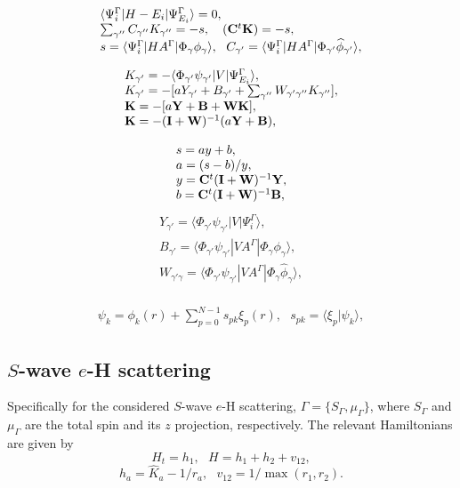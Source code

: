 \documentclass[aip
, pra
, showpacs
, aps
, twocolumn
, groupedaddress
, floatfix
]{revtex4}
\newcommand{\beq}{\begin{equation}}
\newcommand{\eeq}{\end{equation}}
\newcommand{\barr}{\begin{array}}
\newcommand{\earr}{\end{array}}
\begin{document}
\beq \barr{l}
\langle\Psi_i^\Gamma|H-E_i|\Psi_{E_i}^{\Gamma}\rangle=0,\\
\sum_{\gamma''}  C_{\gamma''} K_{\gamma''}  = -s
, \ \ \ ({\bf C}^t {\bf K}) = -s,\\
s = \langle \Psi_i^\Gamma |HA^{\Gamma} |\Phi_{\gamma} \phi_{\gamma} \rangle,\ \
C_{\gamma'} =  \langle \Psi_i^\Gamma |HA^{\Gamma} |\Phi_{\gamma'} \widehat{\phi}_{\gamma'} \rangle,
\earr \label{Psi_} \eeq

\beq \barr{l}
K_{\gamma'} = - \langle \Phi_{\gamma'}  \psi_{\gamma'}
| V | \Psi_{E_i}^{ \Gamma} \rangle,\\
K_{\gamma'} =   - [a Y_{\gamma'}   + B_{\gamma'}
+ \sum_{\gamma''}  W_{\gamma' \gamma''} K_{\gamma''}],\\
{\bf K} =   -[a {\bf Y} + {\bf B} + {\bf W K}],\\
{\bf K}  = -({\bf I}+{\bf W})^{-1}   (a {\bf Y}    + {\bf B}),
\earr \eeq

\beq \barr{l}
s = a y  + b,   \\
a = (s - b) / y,\\
y = {\bf C}^t ({\bf I}+{\bf W})^{-1}  {\bf Y}, \\
b = {\bf C}^t ({\bf I}+{\bf W})^{-1}  {\bf B},
\earr \eeq
\beq \barr{l}
Y_{\gamma'} = \langle \Phi_{\gamma'}  \psi_{\gamma'} |V |\Psi_i^{\Gamma} \rangle,\\
B_{\gamma'} = \langle \Phi_{\gamma'}  \psi_{\gamma'} |V A^{\Gamma} |\Phi_{\gamma} \phi_{\gamma} \rangle,\\
W_{\gamma' \gamma} = \langle \Phi_{\gamma'}  \psi_{\gamma'} |V A^{\Gamma} |\Phi_{\gamma} \widehat{\phi}_{\gamma} \rangle,\\
\earr \label{Psi_} \eeq

\beq \barr{l}
\psi_k = \phi_k(r) +  \sum_{p=0}^{N-1} s_{pk} \xi_p(r), \ \ \ s_{pk} = \langle \xi_p | \psi_k \rangle,
\earr \label{Psi_} \eeq


\subsection{$S$-wave $e$-H scattering}

Specifically for the considered $S$-wave $e$-H scattering,
$\Gamma=\{S_\Gamma,\mu_\Gamma\}$, where $S_\Gamma$ and $\mu_\Gamma$ are the total spin and its $z$ projection, respectively.
The relevant Hamiltonians are given by
\beq
H_t = h_1, \ \ \ H = h_1 + h_2 + v_{12},
\label{H_t} \eeq
\beq
h_a = \hat{K}_a  - 1/r_a,\ \ \ v_{12} = 1/\max{(r_{1}, r_{2})}.
\label{h_b} \eeq
\end{document}

